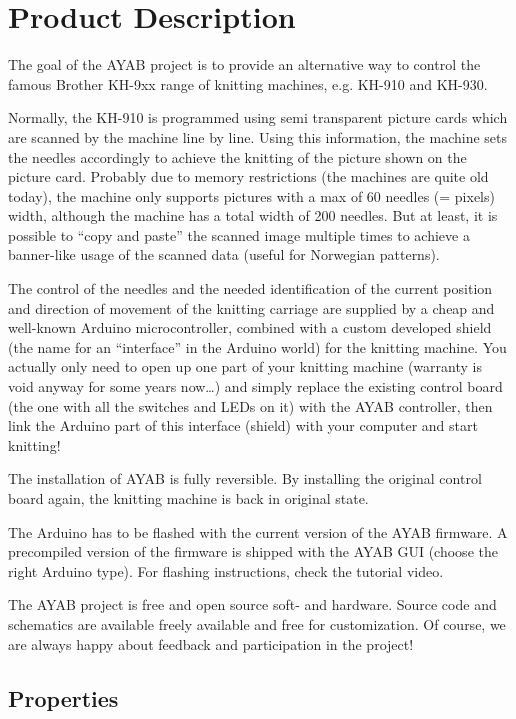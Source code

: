 \documentclass[fleqn,10pt]{SelfArx} %
\begin{document}

\section{Product Description}

The goal of the AYAB project is to provide an alternative way to control the famous Brother KH-9xx range of knitting machines, e.g. KH-910 and KH-930.

Normally, the KH-910 is programmed using semi transparent picture cards which are scanned by the machine line by line. Using this information, the machine sets the needles accordingly to achieve the knitting of the picture shown on the picture card.
Probably due to memory restrictions (the machines are quite old today), the machine only supports pictures with a max of 60 needles (= pixels) width, although the machine has a total width of 200 needles. But at least, it is possible to “copy and paste” the scanned image multiple times to achieve a banner-like usage of the scanned data (useful for Norwegian patterns).

The control of the needles and the needed identification of the current position and direction of movement of the knitting carriage are supplied by a cheap and well-known Arduino microcontroller, combined with a custom developed shield (the name for an “interface” in the Arduino world) for the knitting machine.
You actually only need to open up one part of your knitting machine (warranty is void anyway for some years now…) and simply replace the existing control board (the one with all the switches and LEDs on it) with the AYAB controller, then link the Arduino part of this interface (shield) with your computer and start knitting!

The installation of AYAB is fully reversible. By installing the original control board again, the knitting machine is back in original state.

The Arduino has to be flashed with the current version of the AYAB firmware. A precompiled version of the firmware is shipped with the AYAB GUI (choose the right Arduino type). For flashing instructions, check the tutorial video.

The AYAB project is free and open source soft- and hardware. Source code and schematics are available freely available and free for customization. Of course, we are always happy about feedback and participation in the project!

 \subsection*{Properties}
\end{document}
